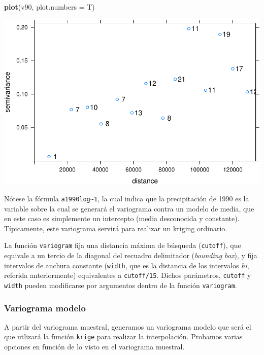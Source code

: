 \documentclass[11pt,]{article}
\newenvironment{Shaded}{\begin{snugshade}}{\end{snugshade}}
\newcommand{\KeywordTok}[1]{\textcolor[rgb]{0.13,0.29,0.53}{\textbf{#1}}}
\newcommand{\DataTypeTok}[1]{\textcolor[rgb]{0.13,0.29,0.53}{#1}}
\newcommand{\NormalTok}[1]{#1}
\begin{document}
\begin{Shaded}
\begin{Highlighting}[]
\KeywordTok{plot}\NormalTok{(v90, }\DataTypeTok{plot.numbers =}\NormalTok{ T)}
\end{Highlighting}
\end{Shaded}

\includegraphics[width=800px]{Proyecto-Precipitaciones_files/figure-latex/vgm-pre1990-1}

Nótese la fórmula \texttt{a1990log\textasciitilde{}1}, la cual indica
que la precipitación de 1990 es la variable sobre la cual se generará el
variograma contra un modelo de media, que en este caso es simplemente un
intercepto (media desconocida y constante). Típicamente, este variograma
servirá para realizar un kriging ordinario.

La función \texttt{variogram} fija una distancia máxima de búsqueda
(\texttt{cutoff}), que equivale a un tercio de la diagonal del recuadro
delimitador (\emph{bounding box}), y fija intervalos de anchura
constante (\texttt{width}, que es la distancia de los intervalos
\emph{hi}, referida anteriormente) equivalentes a \texttt{cutoff/15}.
Dichos parámetros, \texttt{cutoff} y \texttt{width} pueden modificarse
por argumentos dentro de la función \texttt{variogram}.

\subsubsection{Variograma modelo}\label{variograma-modelo}

A partir del variograma muestral, generamos un variograma modelo que
será el que utlizará la función \texttt{krige} para realizar la
interpolación. Probamos varias opciones en función de lo visto en el
variograma muestral.
\end{document}
